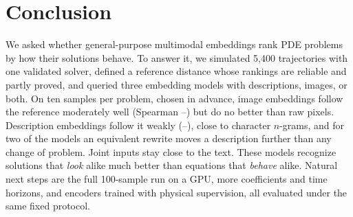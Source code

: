 \section{Conclusion}
We asked whether general-purpose multimodal embeddings rank PDE problems by how their solutions behave. To answer it, we simulated 5,400 trajectories with one validated solver, defined a reference distance whose rankings are reliable and partly proved, and queried three embedding models with descriptions, images, or both. On ten samples per problem, chosen in advance, image embeddings follow the reference moderately well (Spearman \spImageMin--\spImageMax{}) but do no better than raw pixels. Description embeddings follow it weakly (\spTextMin--\spTextMax{}), close to character $n$-grams, and for two of the models an equivalent rewrite moves a description further than any change of problem. Joint inputs stay close to the text. These models recognize solutions that \emph{look} alike much better than equations that \emph{behave} alike. Natural next steps are the full 100-sample run on a GPU, more coefficients and time horizons, and encoders trained with physical supervision, all evaluated under the same fixed protocol.
